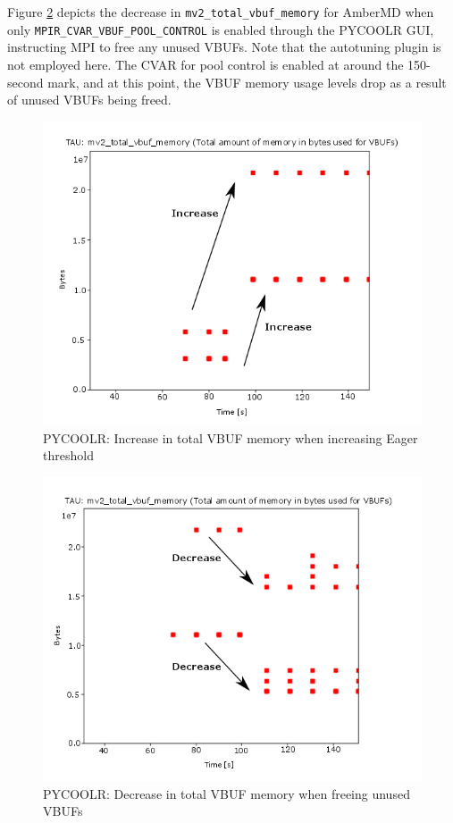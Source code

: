 Figure \ref{fig:pycoolrdecr} depicts the decrease in \verb+mv2_total_vbuf_memory+ for AmberMD when only \verb+MPIR_CVAR_VBUF_POOL_CONTROL+ is enabled through the PYCOOLR GUI, instructing MPI to free any unused VBUFs. Note that the autotuning plugin is not employed here. The CVAR for pool control is enabled at around the 150-second mark, and at this point, the VBUF memory usage levels drop as a result of unused VBUFs being freed.
 \begin{figure}[tbp!]
  \centering
  \captionsetup{justification=centering}
  \includegraphics[scale=0.45,keepaspectratio]{figures/Pycoolr-Eager-Part1-plot3-arrows-unblur}
 \caption{PYCOOLR: Increase in total VBUF memory when increasing Eager threshold}
 \label{fig:pycoolrincr}
\end{figure}

 \begin{figure}[tbp!]
 \centering
  \captionsetup{justification=centering}
 \includegraphics[scale=0.45,keepaspectratio]{figures/Pycoolr-Eager-Part2-plot3-arrows-unblur}
 \caption{PYCOOLR: Decrease in total VBUF memory when freeing unused VBUFs}
 \label{fig:pycoolrdecr}
\end{figure}

